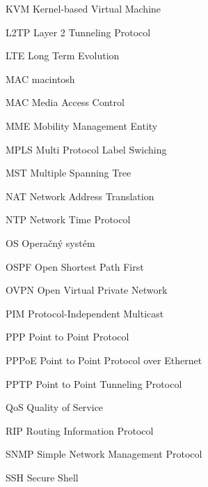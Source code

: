 \begin{seznamzkratek}{90}
		{KVM}								%
		{Kernel-based Virtual Machine}	
	
		{L2TP}								%
		{Layer 2 Tunneling Protocol }	
	
		{LTE}								%
		{Long Term Evolution}
				
	
		{MAC}								%
		{macintosh}
		
		{MAC}								%
		{Media Access Control}	
		
		{MME}								%
		{Mobility Management Entity}	
	
		{MPLS}								%
		{Multi Protocol Label Swiching}		
	
		{MST}								%
		{Multiple Spanning Tree}
		
		{NAT}								%
		{Network Address Translation}	
		
		{NTP}								%
		{Network Time Protocol}		
	
		{OS}								%
		{Operačný systém}	
	
		{OSPF}								%
		{Open Shortest Path First}		
		
		{OVPN}								%
		{Open Virtual Private Network}		
		
		{PIM}								%
		{Protocol-Independent Multicast}
	
		{PPP}								%
		{Point to Point Protocol}		
	
		{PPPoE}								%
		{Point to Point Protocol over Ethernet}
		
		{PPTP}								%
		{Point to Point Tunneling Protocol}		
	
		{QoS}								%
		{Quality of Service}	
		
		{RIP}								%
		{Routing Information Protocol}	
	
		{SNMP}								%
		{Simple Network Management Protocol}		
	
		{SSH}								%
		{Secure Shell}	
	

\end{seznamzkratek}
